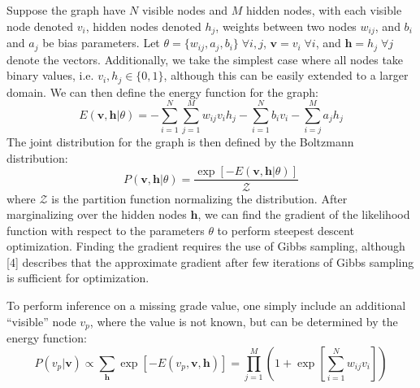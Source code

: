 \documentclass[12pt]{article}
\newcommand{\de}{\partial}
\begin{document}
Suppose the graph have $N$ visible nodes and $M$ hidden nodes,
with each visible node denoted $v_i$, hidden nodes denoted $h_j$, 
weights between two nodes $w_{ij}$,
and $b_i$ and $a_j$ be bias parameters.
Let $\theta = \{ w_{ij},a_j,b_i \} \; \forall i,j$,
$\mathbf{v} = {v_i} \; \forall i$,
and $\mathbf{h} = {h_j} \; \forall j$ denote the vectors.
Additionally, we take the simplest case where
all nodes take binary values, i.e. $v_i, h_j \in \{0,1\}$,
although this can be easily extended to a larger domain.
We can then define the energy function for the graph:
%
\begin{equation}
    E(\mathbf{v},\mathbf{h}|\theta) = 
        - \displaystyle\sum_{i=1}^N \displaystyle\sum_{j=1}^M
             w_{ij} v_i h_j 
        - \displaystyle\sum_{i=1}^N b_i v_i
        - \displaystyle\sum_{i=j}^M a_j h_j
\end{equation}
%
The joint distribution for the graph is then defined
by the Boltzmann distribution:
%
\begin{equation}
    P(\mathbf{v},\mathbf{h}|\theta) = 
        \frac{\exp\left[-E(\mathbf{v},\mathbf{h}|\theta)\right]}
        {\mathcal{Z}}
\end{equation}
%
where $\mathcal{Z}$ is the partition function normalizing
the distribution.
After marginalizing over the hidden nodes $\mathbf{h}$, 
we can find the gradient of the likelihood function
with respect to the parameters $\theta$
to perform steepest descent optimization.
Finding the gradient requires the use of Gibbs sampling,
although [4] describes that the approximate gradient
after few iterations of Gibbs sampling is sufficient
for optimization.
%
%

To perform inference on a missing grade value,
one simply include an additional ``visible'' node $v_p$,
where the value is not known, 
but can be determined by the energy function:
%
\begin{equation}
    P(v_p|\mathbf{v}) \propto
        \displaystyle\sum_{\mathbf{h}} 
        \exp[-E(v_p,\mathbf{v},\mathbf{h})]
    = \prod_{j=1}^M \left( 1 + 
        \exp\left[\sum_{i=1}^N w_{ij} v_i\right]
        \right)
\end{equation}
\end{document}
